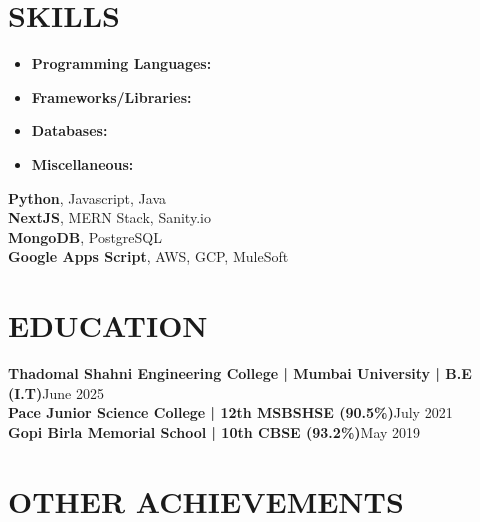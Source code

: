 \documentclass[a4paper,11pt]{article}
\newcommand{\entry}[2]{
  \noindent\textbf{#1}\hfill{#2}\\[-1em]
}
\newenvironment{itemizeWithPadding}{
  \begin{itemize}
}{
  \end{itemize}
  \vspace{0.5em} %
}
\begin{document}
\section*{SKILLS}
\vspace{-1.25em}
\begin{minipage}{0.3\textwidth}
    \begin{itemize}
        \item \textbf{Programming Languages:}
        \item \textbf{Frameworks/Libraries:}
        \item \textbf{Databases:}
        \item \textbf{Miscellaneous:}
    \end{itemize}
\end{minipage}
\begin{minipage}{0.7\textwidth}
    \vspace{1.75em}
    \setlength{\baselineskip}{1.2\baselineskip}  %
     \textbf{Python}, {Javascript}, Java\\
     \textbf{NextJS}, MERN Stack, Sanity.io\\
     \textbf{MongoDB}, PostgreSQL\\
     \textbf{Google Apps Script}, AWS, GCP, MuleSoft\\    
\end{minipage}
\vspace{-2em}

\section*{EDUCATION}

\entry{Thadomal Shahni Engineering College | Mumbai University | B.E (I.T)}{June 2025}

\entry{Pace Junior Science College | 12th MSBSHSE (90.5\%)}{July 2021}

\entry{Gopi Birla Memorial School | 10th CBSE (93.2\%)}{May 2019}

\section*{OTHER ACHIEVEMENTS}
\end{document}
